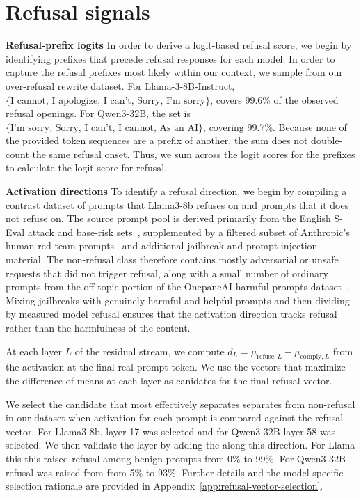 \documentclass{article}
\begin{document}
\section{Refusal signals}

\textbf{Refusal-prefix logits} In order to derive a logit-based refusal score, we begin by identifying prefixes that precede refusal responses for each model. In order to capture the refusal prefixes most likely within our context, we sample from our over-refusal rewrite dataset. For Llama-3-8B-Instruct, \\ \(\{\text{I cannot, I apologize, I can't, Sorry, I'm sorry}\}\), covers 99.6\% of the observed refusal openings. For Qwen3-32B, the set is \(\{\text{I'm sorry, Sorry, I can't, I cannot, As an AI}\}\), covering 99.7\%. Because none of the provided token sequences are a prefix of another, the sum does not double-count the same refusal onset. Thus, we sum across the logit scores for the prefixes to calculate the logit score for refusal.


\textbf{Activation directions} To identify a refusal direction, we begin by compiling a contrast dataset of prompts that Llama3-8b refuses on and prompts that it does not refuse on. The source prompt pool is derived primarily from the English S-Eval attack and base-risk sets~\citep{yuan2024seval}, supplemented by a filtered subset of Anthropic’s human red-team prompts~\citep{ganguli2022redteaming} and additional jailbreak and prompt-injection material. The non-refusal class therefore contains mostly adversarial or unsafe requests that did not trigger refusal, along with a small number of ordinary prompts from the off-topic portion of the OnepaneAI harmful-prompts dataset~\citep{onepaneai2024harmfulprompts}. Mixing jailbreaks with genuinely harmful and helpful prompts and then dividing by measured model refusal ensures that the activation direction tracks refusal rather than the harmfulness of the content. 

At each layer \(L\) of the residual stream, we compute \(d_L=\mu_{\mathrm{refuse},L}-\mu_{\mathrm{comply},L}\) from the activation at the final real prompt token. We use the vectors that maximize the difference of means at each layer as canidates for the final refusal vector.

We select the candidate that most effectively separates separates from non-refusal in our dataset when activation for each prompt is compared against the refusal vector. For Llama3-8b, layer 17 was selected and for Qwen3-32B layer 58 was selected. We then validate the layer by adding the along this direction. For Llama this this raised refusal among benign prompts from 0\% to 99\%. For Qwen3-32B refusal was raised from from 5\% to 93\%. Further details and the model-specific selection rationale are provided in Appendix~\ref{app:refusal-vector-selection}.
\end{document}
